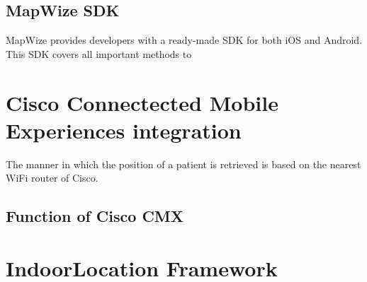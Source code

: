 \subsection{MapWize SDK}
MapWize provides developers with a ready-made SDK for both iOS and Android. This SDK covers all important methods to 
\section{Cisco Connectected Mobile Experiences integration}
The manner in which the position of a patient is retrieved is based on the nearest WiFi router of Cisco.
\subsection{Function of Cisco CMX}
\section{IndoorLocation Framework}



